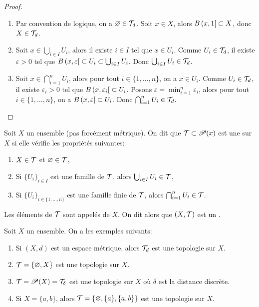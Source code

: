 \begin{proof}\,
    \begin{enumerate}[label=(\roman*)]
        \item Par convention de logique, on a \(\varnothing\in \mathcal{T}_d\).
        Soit \(x \in X\), alors \(B\left({x}, {1}\mathopen{}\right[\mathclose{} \subset X\), donc \(X \in \mathcal{T}_d\).

        \item Soit \(x \in \bigcup_{i \in I} U_i\), alors il existe \(i \in I\) tel que \(x \in U_i\).
        Comme \(U_i \in \mathcal{T}_d\), il existe \(\varepsilon > 0\) tel que \(B\left({x}, {\varepsilon}\mathopen{}\right[\mathclose{} \subset U_i \subset \bigcup_{i \in I} U_i\).
        Donc \(\bigcup_{i \in I} U_i \in \mathcal{T}_d\).

        \item Soit \(x \in \bigcap_{i = 1}^n U_i\), alors pour tout \(i \in \{1, \ldots, n\}\), on a \(x \in U_i\).
        Comme \(U_i \in \mathcal{T}_d\), il existe \(\varepsilon_i > 0\) tel que \(B\left({x}, {\varepsilon_i}\mathopen{}\right[\mathclose{} \subset U_i\).
        Posons \(\varepsilon = \min_{i = 1}^n \varepsilon_i\), alors pour tout \(i \in \{1, \ldots, n\}\), on a \(B\left({x}, {\varepsilon}\mathopen{}\right[\mathclose{} \subset U_i\).
        Donc \(\bigcap_{i = 1}^n U_i \in \mathcal{T}_d\).
    \end{enumerate}
\end{proof}

\begin{definition}
    Soit \(X\) un ensemble (pas forcément métrique). On dit que
    \(\mathcal{T} \subset\mathscr{P}(x)\) est une  sur \(X\) si
    elle vérifie les propriétés suivantes:
    \begin{enumerate}[label=(\roman*)]
        \item \(X \in \mathcal{T}\) et \(\varnothing \in \mathcal{T}\),
        \item Si \({\{U_i\}}_{i \in I}\) est une famille de \(\mathcal{T}\), alors \(\bigcup_{i \in I} U_i \in \mathcal{T}\),
        \item Si  \({\{U_i\}}_{i \in \{1, \ldots, n\}}\) est une famille finie de \(\mathcal{T}\), alors \(\bigcap_{i = 1}^n U_i \in \mathcal{T}\).
    \end{enumerate}

    Les éléments de \(\mathcal{T}\) sont appelés  de \(X\).
    On dit alors que \((X, \mathcal{T})\) est un .
\end{definition}

\begin{example}
    Soit \(X\) un ensemble. On a les exemples suivants:
    \begin{enumerate}[label=(\alph*)]
        \item Si \((X, d)\) est un espace métrique, alors \(\mathcal{T}_d\) est une topologie sur \(X\).
        \item \(\mathcal{T} = \{\varnothing, X\}\) est une topologie sur \(X\).
        \item \(\mathcal{T} = \mathscr{P}(X) = \mathcal{T}_\delta\) est une topologie sur \(X\) où \(\delta\) est la distance discrète.
        \item Si \(X = \{a, b\}\), alors \(\mathcal{T} = \{\varnothing, \{a\}, \{a, b\}\}\) est une topologie sur \(X\).
    \end{enumerate}
\end{example}

